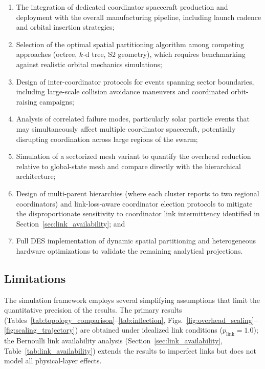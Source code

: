 \documentclass[journal]{IEEEtran}
\begin{document}
\begin{enumerate}
    \item The integration of dedicated coordinator spacecraft production and deployment with the overall manufacturing pipeline, including launch cadence and orbital insertion strategies;
    \item Selection of the optimal spatial partitioning algorithm among competing approaches (octree, $k$-d tree, S2 geometry), which requires benchmarking against realistic orbital mechanics simulations;
    \item Design of inter-coordinator protocols for events spanning sector boundaries, including large-scale collision avoidance maneuvers and coordinated orbit-raising campaigns;
    \item Analysis of correlated failure modes, particularly solar particle events that may simultaneously affect multiple coordinator spacecraft, potentially disrupting coordination across large regions of the swarm;
    \item Simulation of a sectorized mesh variant to quantify the overhead reduction relative to global-state mesh and compare directly with the hierarchical architecture;
    \item Design of multi-parent hierarchies (where each cluster reports to two regional coordinators) and link-loss-aware coordinator election protocols to mitigate the disproportionate sensitivity to coordinator link intermittency identified in Section~\ref{sec:link_availability}; and
    \item Full DES implementation of dynamic spatial partitioning and heterogeneous hardware optimizations to validate the remaining analytical projections.
\end{enumerate}

\subsection{Limitations}

The simulation framework employs several simplifying assumptions that limit the quantitative precision of the results. The primary results (Tables~\ref{tab:topology_comparison}--\ref{tab:inflection}, Figs.~\ref{fig:overhead_scaling}--\ref{fig:scaling_trajectory}) are obtained under idealized link conditions ($p_{\text{link}} = 1.0$); the Bernoulli link availability analysis (Section~\ref{sec:link_availability}, Table~\ref{tab:link_availability}) extends the results to imperfect links but does not model all physical-layer effects.
\end{document}
